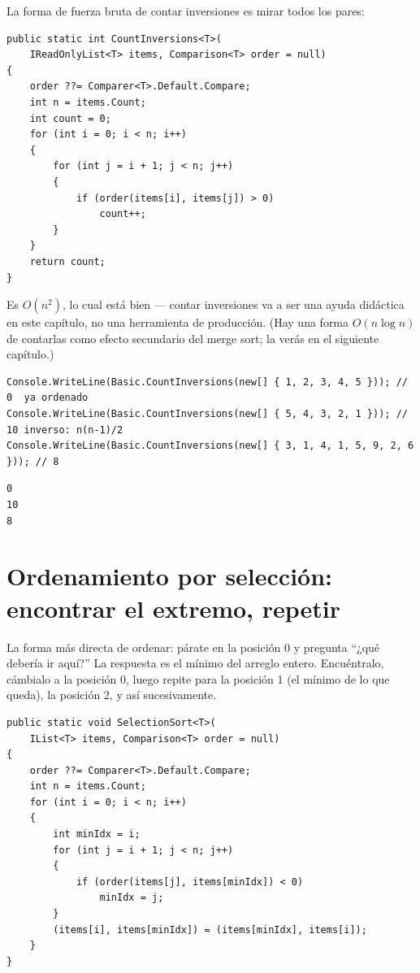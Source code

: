 \documentclass[11pt,a4paper]{article}
\begin{document}
La forma de fuerza bruta de contar inversiones es mirar todos los pares:

\begin{lstlisting}[caption={Conteo de inversiones por fuerza bruta}]
public static int CountInversions<T>(
    IReadOnlyList<T> items, Comparison<T> order = null)
{
    order ??= Comparer<T>.Default.Compare;
    int n = items.Count;
    int count = 0;
    for (int i = 0; i < n; i++)
    {
        for (int j = i + 1; j < n; j++)
        {
            if (order(items[i], items[j]) > 0)
                count++;
        }
    }
    return count;
}
\end{lstlisting}

Es $O(n^2)$, lo cual está bien --- contar inversiones va a ser una ayuda didáctica en este capítulo, no una herramienta de producción. (Hay una forma $O(n \log n)$ de contarlas como efecto secundario del merge sort; la verás en el siguiente capítulo.)

\begin{lstlisting}
Console.WriteLine(Basic.CountInversions(new[] { 1, 2, 3, 4, 5 })); // 0  ya ordenado
Console.WriteLine(Basic.CountInversions(new[] { 5, 4, 3, 2, 1 })); // 10 inverso: n(n-1)/2
Console.WriteLine(Basic.CountInversions(new[] { 3, 1, 4, 1, 5, 9, 2, 6 })); // 8
\end{lstlisting}

\begin{verbatim}
0
10
8
\end{verbatim}

\section{Ordenamiento por selección: encontrar el extremo, repetir}

La forma más directa de ordenar: párate en la posición 0 y pregunta ``¿qué debería ir aquí?'' La respuesta es el mínimo del arreglo entero. Encuéntralo, cámbialo a la posición 0, luego repite para la posición 1 (el mínimo de lo que queda), la posición 2, y así sucesivamente.

\begin{lstlisting}[caption={Ordenamiento por selección}]
public static void SelectionSort<T>(
    IList<T> items, Comparison<T> order = null)
{
    order ??= Comparer<T>.Default.Compare;
    int n = items.Count;
    for (int i = 0; i < n; i++)
    {
        int minIdx = i;
        for (int j = i + 1; j < n; j++)
        {
            if (order(items[j], items[minIdx]) < 0)
                minIdx = j;
        }
        (items[i], items[minIdx]) = (items[minIdx], items[i]);
    }
}
\end{lstlisting}
\end{document}
